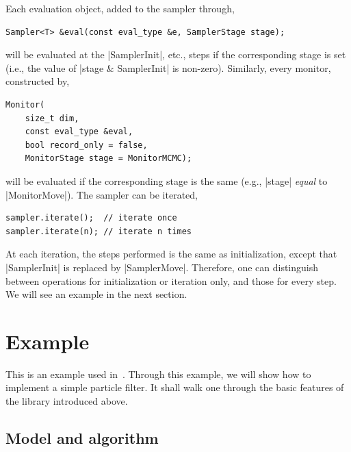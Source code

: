 Each evaluation object, added to the sampler through,
\begin{Verbatim}
Sampler<T> &eval(const eval_type &e, SamplerStage stage);
\end{Verbatim}
will be evaluated at the |SamplerInit|, etc., steps if the corresponding stage
is set (i.e., the value of |stage & SamplerInit| is non-zero). Similarly, every
monitor, constructed by,
\begin{Verbatim}
Monitor(
    size_t dim,
    const eval_type &eval,
    bool record_only = false,
    MonitorStage stage = MonitorMCMC);
\end{Verbatim}
will be evaluated if the corresponding stage is the same (e.g., |stage|
\emph{equal} to |MonitorMove|). The sampler can be iterated,
\begin{Verbatim}
sampler.iterate();  // iterate once
sampler.iterate(n); // iterate n times
\end{Verbatim}
At each iteration, the steps performed is the same as initialization, except
that |SamplerInit| is replaced by |SamplerMove|. Therefore, one can distinguish
between operations for initialization or iteration only, and those for every
step. We will see an example in the next section.

\section{Example}
\label{sec:Example (PF)}

This is an example used in~\cite{Johansen:2009wd}. Through this example, we
will show how to implement a simple particle filter. It shall walk one through
the basic features of the library introduced above.

\subsection{Model and algorithm}
\label{sub:Model and algorithm}

